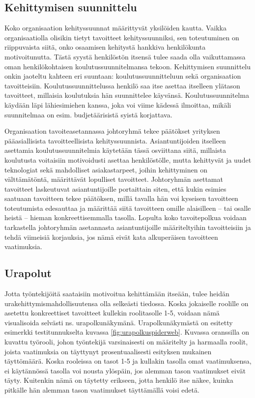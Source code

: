 \documentclass[a4paper,finnish,12pt]{article}
\begin{document}
\subsection{Kehittymisen suunnittelu}

Koko organisaation kehityssuunnat määrittyvät yksilöiden kautta. Vaikka organisaatiolla olisikin tietyt tavoitteet kehityssuunniksi, sen toteutuminen on riippuvaista siitä, onko osaamisen kehitystä hankkiva henkilökunta motivoitunutta. Tästä syystä henkilöstön itsensä tulee saada olla vaikuttamassa oman henkilökohtaisen koulutussuunnitelmansa tekoon. Kehittymisen suunnittelu onkin jaoteltu kahteen eri suuntaan: koulutussuunnitteluun sekä organisaation tavoitteisiin. Koulutussuunnittelussa henkilö saa itse asettaa itselleen ylätason tavoitteet, millaisia koulutuksia hän suunnittelee käyvänsä. Koulutussuunnitelma käydään läpi lähiesimiehen kanssa, joka voi viime kädessä ilmoittaa, mikäli suunnitelmaa on esim. budjetäärisistä syistä korjattava.

Organisaation tavoiteasetannassa johtoryhmä tekee päätökset yrityksen pääasiallisista tavoitteellisista kehityssuunnista. Asiantuntijoiden itselleen asettamia koulutussuunnitelmia käytetään tässä osviittana siitä, millaista koulutusta voitaisiin motivoidusti asettaa henkilöstölle, mutta kehittyvät ja uudet teknologiat sekä mahdolliset asiakastarpeet, joihin kehittyminen on välttämätöntä, määrittävät lopulliset tavoitteet. Johtoryhmän asettamat tavoitteet laskeutuvat asiantuntijoille portaittain siten, että kukin esimies saatuaan tavoitteen tekee päätöksen, millä tavalla hän voi kyseisen tavoitteen toteutumista edesauttaa ja määrittää siitä tavoitteen omille alaisilleen -- tai osalle heistä -- hieman konkreettisemmalla tasolla. Lopulta koko tavoitepolkua voidaan tarkastella johtoryhmän asetannasta asiantuntijoille määriteltyihin tavoitteisiin ja tehdä viimeisiä korjauksia, jos nämä eivät kata alkuperäisen tavoitteen vaatimuksia.

\subsection{Urapolut}

Jotta työntekijöitä saataisiin motivoitua kehittämään itseään, tulee heidän urakehittymismahdollisuutensa olla selkeästi tiedossa. Koska jokaiselle roolille on asetettu konkreettiset tavoitteet kullekin roolitasolle 1-5, voidaan nämä visualisoida selvästi ns. urapolkunäkymänä. Urapolkunäkymästä on esitetty esimerkki testitunnukselta kuvassa \ref{fig:urapolkuspiderweb}. Kuvassa oranssilla on kuvattu työrooli, johon työntekijä varsinaisesti on määritelty ja harmaalla roolit, joista vaatimuksia on täyttynyt prosentuaalisesti esityksen mukainen täyttömäärä. Koska rooleissa on tasot 1-5 ja kullakin tasolla omat vaatimuksensa, ei käytännössä tasolla voi nousta ylöspäin, jos alemman tason vaatimukset eivät täyty. Kuitenkin nämä on täytetty erikseen, jotta henkilö itse näkee, kuinka pitkälle hän alemman tason vaatimukset täyttämällä voisi edetä.
\end{document}
